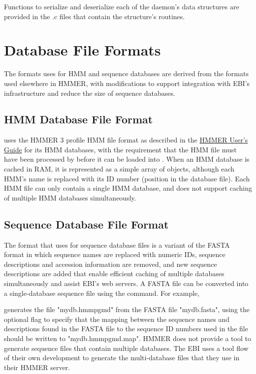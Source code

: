 \documentclass[notoc,justified]{tufte-book}    %
\begin{document}
Functions to serialize and deserialize each of the daemon's data structures are provided in the .c files that contain the structure's routines.     

\chapter{Database File Formats}
The formats  uses for HMM and sequence databases are derived from the formats used elsewhere in HMMER, with modifications to support integration with EBI's infrastructure and reduce the size of sequence databases.

\section{HMM Database File Format}
 uses the HMMER 3 profile HMM file format as described in the \underline{HMMER User's Guide} for its HMM databases, with the requirement that the HMM file must have been processed by  before it can be loaded into .  When an HMM database is cached in RAM, it is represented as a simple array of  objects, although each HMM's name is replaced with its ID number (position in the database file).  Each HMM file can only contain a single HMM database, and  does not support caching of multiple HMM databases simultaneously.

\section{Sequence Database File Format}
The  format that  uses for sequence database files is a variant of the FASTA format in which sequence names are replaced with numeric IDs, sequence descriptions and accession information are removed, and new sequence descriptions are added that enable efficient caching of multiple databases simultaneously and assist EBI's web servers.  
A FASTA file can be converted into a single-database 
sequence file using the  command.  For example, 


generates the  file "mydb.hmmpgmd" from the FASTA file "mydb.fasta", using the optional  flag to specify that the mapping between the sequence names and descriptions found in the FASTA file to the sequence ID numbers used in the  file should be written to "mydb.hmmpgmd.map".  HMMER does not provide a tool to generate sequence files that contain multiple databases.  The EBI uses a tool flow of their own development to generate the multi-database files that they use in their HMMER server.
 
\end{document}

